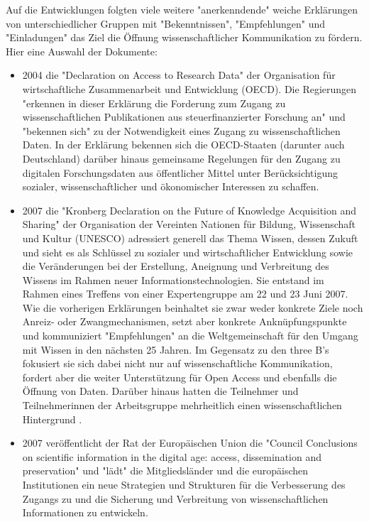 Auf die Entwicklungen folgten viele weitere "anerkenndende" weiche Erklärungen von unterschiedlicher Gruppen mit "Bekenntnissen", "Empfehlungen" und "Einladungen" das Ziel die Öffnung wissenschaftlicher Kommunikation zu fördern. Hier eine Auswahl der Dokumente:
\begin{itemize}
\item 2004 die "Declaration on Access to Research Data" \cite{oecd_2004} der Organisation für wirtschaftliche Zusammenarbeit und Entwicklung (OECD). Die Regierungen "erkennen in dieser Erklärung die Forderung zum Zugang zu wissenschaftlichen Publikationen aus steuerfinanzierter Forschung an" und "bekennen sich" zu der Notwendigkeit eines Zugang zu wissenschaftlichen Daten. In der Erklärung bekennen sich die OECD-Staaten (darunter auch Deutschland) darüber hinaus gemeinsame Regelungen für den Zugang zu digitalen Forschungsdaten aus öffentlicher Mittel unter Berücksichtigung sozialer, wissenschaftlicher und ökonomischer Interessen zu schaffen.
\item 2007 die "Kronberg Declaration on the Future of Knowledge Acquisition and Sharing" \cite{unesco_2007} der Organisation der Vereinten Nationen für Bildung, Wissenschaft und Kultur (UNESCO) adressiert generell das Thema Wissen, dessen Zukuft und sieht es als Schlüssel zu sozialer und wirtschaftlicher Entwicklung sowie die Veränderungen bei der Erstellung, Aneignung und Verbreitung des Wissens im Rahmen neuer Informationstechnologien. Sie entstand im Rahmen eines Treffens von einer Expertengruppe am 22 und 23 Juni 2007. Wie die vorherigen Erklärungen beinhaltet sie zwar weder konkrete Ziele noch Anreiz- oder Zwangmechanismen, setzt aber konkrete Anknüpfungspunkte und kommuniziert "Empfehlungen" an die Weltgemeinschaft für den Umgang mit Wissen in den nächsten 25 Jahren. Im Gegensatz zu den three B's fokusiert sie sich dabei nicht nur auf wissenschaftliche Kommunikation, fordert aber die weiter Unterstützung für Open Access und ebenfalls die Öffnung von Daten. Darüber hinaus hatten die Teilnehmer und Teilnehmerinnen der Arbeitsgruppe mehrheitlich einen wissenschaftlichen Hintergrund \cite{unesco_2007_list}.
\item 2007 veröffentlicht der Rat der Europäischen Union die "Council Conclusions on scientific information in the digital age: access, dissemination and preservation" \cite{eu_council_2007} und "lädt" die Mitgliedsländer und die europäischen Institutionen ein neue Strategien und Strukturen für die Verbesserung des Zugangs zu und die Sicherung und Verbreitung von wissenschaftlichen Informationen zu entwickeln.

\end{itemize}
